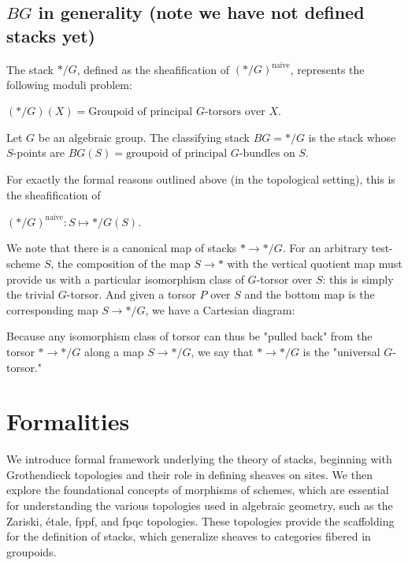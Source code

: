 \documentclass[12pt]{article}
\begin{document}
\subsection{$BG$ in generality (note we have not defined stacks yet)}
\begin{proposition}
    The stack $*/G$, defined as the sheafification of $(*/G)^{\text{naive}}$, represents the following moduli problem:
    \begin{center}
        $(*/G)(X) = \text{Groupoid of principal } G\text{-torsors over } X$.
    \end{center}
\end{proposition}

\begin{definition}
    Let $G$ be an algebraic group. The classifying stack $BG = */G$ is the stack whose $S$-points are $BG(S) = \text{groupoid of principal } G\text{-bundles on } S$.
\end{definition}
For exactly the formal reasons outlined above (in the topological setting), this is the sheafification of
\begin{center}
    $(*/G)^{\text{naive}} : S \mapsto */G(S)$.
\end{center}
We note that there is a canonical map of stacks $* \to */G$. For an arbitrary test-scheme $S$, the composition of the map $S \to *$ with the vertical quotient map must provide us with a particular isomorphism class of $G$-torsor over $S$: this is simply the trivial $G$-torsor. And given a torsor $P$ over $S$ and the bottom map is the corresponding map $S \to */G$, we have a Cartesian diagram:
\begin{center}
\end{center}

Because any isomorphism class of torsor can thus be "pulled back" from the torsor $* \to */G$ along a map $S \to */G$, we say that $* \to */G$ is the "universal $G$-torsor."

\section{Formalities}
We introduce formal framework underlying the theory of stacks, beginning with Grothendieck topologies and their role in defining sheaves on sites. We then explore the foundational concepts of morphisms of schemes, which are essential for understanding the various topologies used in algebraic geometry, such as the Zariski, étale, fppf, and fpqc topologies. These topologies provide the scaffolding for the definition of stacks, which generalize sheaves to categories fibered in groupoids.
\end{document}
